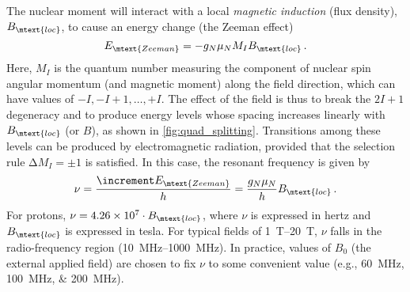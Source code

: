 \documentclass[nobib,nofonts,nols,nohyper]{tufte-handout}
\begin{document}
The nuclear moment will interact with a local \emph{magnetic induction} (flux density), 
\( B_\mtext{loc} \), to cause an energy change (the Zeeman effect)
\begin{equation}
	E_\mtext{Zeeman} = -g_N \mu_N M_I B_\mtext{loc} \, .
	\label{eq:zeeman_energy}
\end{equation}
Here, \( M_I \) is the quantum number measuring the component of nuclear spin angular momentum (and magnetic moment) along the field direction, which can have values of \( -I, -I+1, \ldots, +I \). 
The effect of the field is thus to break the \( 2I + 1 \) degeneracy and to produce energy levels whose spacing increases linearly with \( B_\mtext{loc} \) (or \( B \)), as shown in \cref{fig:quad_splitting}. 
Transitions among these levels can be produced by electromagnetic radiation, provided that the selection rule \( \increment M_I = \pm 1 \) is satisfied. 
In this case, the resonant frequency is given by 
\begin{equation}
	\nu = \frac{\increment E_\mtext{Zeeman}}{h} = \frac{g_N\mu_N}{h} B_\mtext{loc}\, .
	\label{eq:res_freq}
\end{equation}
For protons, \( \nu = \num{4.26e7} \cdot B_\mtext{loc} \), where \( \nu \) is expressed in hertz and \( B_\mtext{loc} \) is expressed in tesla. For typical fields of \qtyrange{1}{20}{\tesla}, \( \nu \) falls in the radio-frequency region (\qtyrange{10}{1000}{\MHz}). 
In practice, values of \( B_0 \) (the external applied field) are chosen to fix \( \nu \) to some convenient value (e.g., \qtylist{60;100;200}{\MHz}). 
\end{document}

